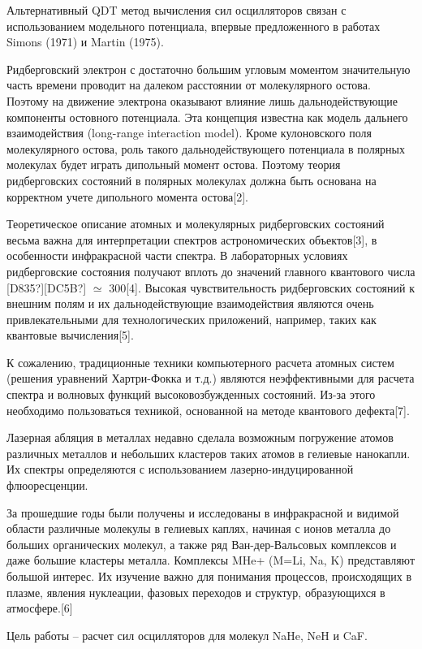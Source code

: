 \documentclass[a4paper]{article}
\begin{document}
Альтернативный QDT метод вычисления сил осцилляторов связан с использованием модельного потенциала, впервые предложенного в работах Simons (1971) и Martin (1975). 

Ридберговский электрон с достаточно большим угловым моментом значительную часть времени проводит на далеком расстоянии от молекулярного остова. Поэтому на движение электрона оказывают влияние лишь дальнодействующие компоненты остовного потенциала. Эта концепция известна как модель дальнего взаимодействия (long-range interaction model). Кроме кулоновского поля молекулярного остова, роль такого дальнодействующего потенциала в полярных молекулах будет играть дипольный момент остова. Поэтому теория ридберговских состояний в полярных молекулах должна быть основана на корректном учете дипольного момента остова[2]. 

Теоретическое описание атомных и молекулярных ридберговских состояний весьма важна для интерпретации спектров астрономических объектов[3], в особенности инфракрасной части спектра. В лабораторных условиях ридберговские состояния получают вплоть до значений главного квантового числа
\textlatin{[D835?]}\textlatin{[DC5B?]} ${\simeq}$ 300[4]. Высокая
чувствительность ридберговских состояний к внешним полям и их дальнодействующие взаимодействия являются очень привлекательными для технологических приложений, например, таких как квантовые вычисления[5]. 

К сожалению, традиционные техники компьютерного расчета атомных систем (решения уравнений Хартри-Фокка и т.д.) являются неэффективными для расчета спектра и волновых функций высоковозбужденных состояний. Из-за этого необходимо пользоваться техникой, основанной на методе квантового дефекта[7].

Лазерная абляция в металлах недавно сделала возможным погружение атомов различных металлов и небольших кластеров таких атомов в гелиевые нанокапли. Их спектры определяются с использованием лазерно-индуцированной флюоресценции. 

За прошедшие годы были получены и исследованы в инфракрасной и видимой области различные молекулы в гелиевых каплях, начиная с ионов металла до больших органических молекул, а также ряд Ван-дер-Вальсовых комплексов и даже большие кластеры металла. Комплексы
MHe+ (M=Li, Na, K) представляют
большой интерес. Их изучение важно для понимания процессов, происходящих в плазме, явления нуклеации, фазовых переходов и структур, образующихся в атмосфере.[6]

Цель работы -- расчет сил осцилляторов для
молекул \foreignlanguage{english}{NaHe}, \foreignlanguage{english}{NeH}
и \foreignlanguage{english}{CaF}. 
\end{document}
